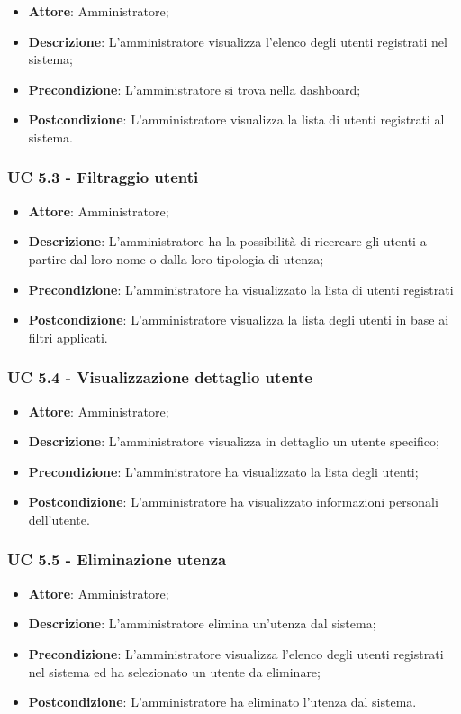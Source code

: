 \begin{itemize}
\item \textbf{Attore}: Amministratore;
\item \textbf{Descrizione}: L'amministratore visualizza l'elenco degli utenti registrati nel sistema;
\item \textbf{Precondizione}: L'amministratore si trova nella dashboard;
\item \textbf{Postcondizione}: L'amministratore visualizza la lista di utenti registrati al sistema.
\end{itemize}

\subsubsection{UC 5.3 - Filtraggio utenti}
\begin{itemize}
\item \textbf{Attore}: Amministratore;
\item \textbf{Descrizione}: L'amministratore ha la possibilità di ricercare gli utenti a partire dal loro nome o dalla loro tipologia di utenza;
\item \textbf{Precondizione}: L'amministratore ha visualizzato la lista di utenti registrati
\item \textbf{Postcondizione}: L'amministratore visualizza la lista degli utenti in base ai filtri applicati.
\end{itemize}

\subsubsection{UC 5.4 - Visualizzazione dettaglio utente}
\begin{itemize}
\item \textbf{Attore}: Amministratore;
\item \textbf{Descrizione}: L'amministratore visualizza in dettaglio un utente specifico;
\item \textbf{Precondizione}: L'amministratore ha visualizzato la lista degli utenti;
\item \textbf{Postcondizione}: L'amministratore ha visualizzato informazioni personali dell'utente.
\end{itemize}


\subsubsection{UC 5.5 - Eliminazione utenza}
\begin{itemize}
\item \textbf{Attore}: Amministratore;
\item \textbf{Descrizione}: L'amministratore elimina un'utenza dal sistema;
\item \textbf{Precondizione}: L'amministratore visualizza l'elenco degli utenti registrati nel sistema ed ha selezionato un utente da eliminare;
\item \textbf{Postcondizione}: L'amministratore ha eliminato l'utenza dal sistema.
\end{itemize}


